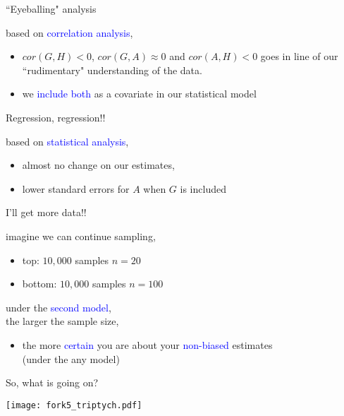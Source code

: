 %
%
\begin{lhframe}[rhgraphic={\texttt{[image: fork5\_panel.pdf]}}]
	{``Eyeballing" analysis}
	
	based on \textcolor{blue}{correlation analysis},
	\begin{itemize}
		\item $cor(G, H)<0$, $cor(G, A) \approx 0$ and $cor(A, H) < 0$ goes in line of our ``rudimentary" understanding of the data.
		\item we \textcolor{blue}{include both} as a covariate in our statistical model
	\end{itemize}
\end{lhframe}
%
%
\begin{lhframe}[rhgraphic={\texttt{[image: fork5\_reg.png]}}]
	{Regression, regression!!}
	
	based on \textcolor{blue}{statistical analysis},
	\begin{itemize}
		\item almost no change on our estimates,
		\item lower standard errors for $A$ when $G$ is included
	\end{itemize}
\end{lhframe}
%
%
\begin{lhframe}[rhgraphic={\texttt{[image: fork5\_samplesize.pdf]}}]
	{I'll get more data!!}
	
	imagine we can continue sampling,
	\begin{itemize}
		\item top: $10,000$ samples $n=20$
		\item bottom: $10,000$ samples $n=100$
	\end{itemize}
	
	under the \textcolor{blue}{second model}, \\
	the larger the sample size,
	\begin{itemize}
		\item the more \textcolor{blue}{certain} you are about your \textcolor{blue}{non-biased} estimates \\
		{\small (under the any model)}
	\end{itemize}
\end{lhframe}
%
%
\begin{frame}
	{So, what is going on?}
	
	\begin{figure*}
		\texttt{[image: fork5\_triptych.pdf]}
	\end{figure*}
\end{frame}
%
%
